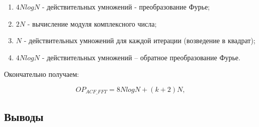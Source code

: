 \begin{enumerate}
\item ${4NlogN}$ - действительных умножений - преобразование Фурье;
\item ${2N}$ - вычисление модуля комплексного числа;
\item ${N}$ - действительных умножений для каждой итерации (возведение в квадрат);
\item ${4NlogN}$ - действительных умножений – обратное преобразование Фурье. 
\end{enumerate}

Окончательно получаем:
\begin{center}
\begin{equation}
	\label{eq:num_of_op_acf}
	OP_{ACF\_FFT}=8NlogN + (k+2)N,
\end{equation}
\end{center}

\subsection{Выводы}

\newpage
